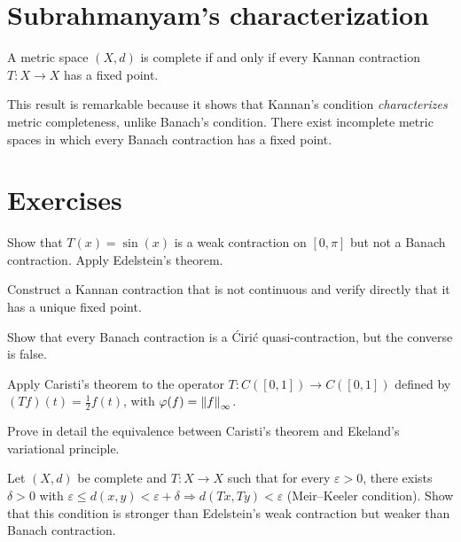 \section{Subrahmanyam's characterization}

\begin{theorem}[Subrahmanyam, 1975]
A metric space $(X, d)$ is complete if and only if every Kannan contraction
$T : X \to X$ has a fixed point.
\end{theorem}

\begin{remark}
This result is remarkable because it shows that Kannan's condition
\emph{characterizes} metric completeness, unlike Banach's condition. There exist
incomplete metric spaces in which every Banach contraction has a fixed point.
\end{remark}

\section{Exercises}

\begin{exercise}
Show that $T(x) = \sin(x)$ is a weak contraction on $[0, \pi]$ but not a
Banach contraction. Apply Edelstein's theorem.
\end{exercise}

\begin{exercise}
Construct a Kannan contraction that is not continuous and verify directly that
it has a unique fixed point.
\end{exercise}

\begin{exercise}
Show that every Banach contraction is a \'Ciri\'c quasi-contraction, but the
converse is false.
\end{exercise}

\begin{exercise}
Apply Caristi's theorem to the operator $T : C([0,1]) \to C([0,1])$ defined by
$(Tf)(t) = \frac{1}{2} f(t)$, with $\varphi(f) = \left\| f \right\|_\infty$.
\end{exercise}

\begin{exercise}
Prove in detail the equivalence between Caristi's theorem and Ekeland's
variational principle.
\end{exercise}

\begin{exercise}
Let $(X, d)$ be complete and $T : X \to X$ such that for every $\varepsilon > 0$,
there exists $\delta > 0$ with $\varepsilon \leq d(x,y) < \varepsilon + \delta
\Rightarrow d(Tx, Ty) < \varepsilon$ (Meir--Keeler condition). Show that this
condition is stronger than Edelstein's weak contraction but weaker than Banach
contraction.
\end{exercise}
